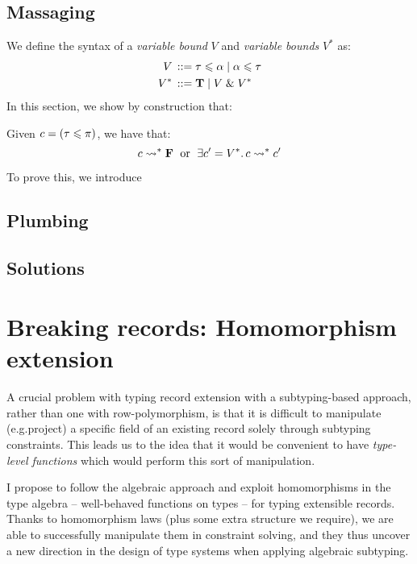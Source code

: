 \subsection{Massaging}
\label{subsec:rewriting}
We define the syntax of a \emph{variable bound} $V$ and \emph{variable bounds} $V^*$ as:
\begin{align*}
    {V} \,::=&\; \tau \leqslant \alpha \mid \alpha \leqslant \tau \\
    {V^*} \,::=&\; \mathbf T \mid V \;\&\; V^*
\end{align*}
In this section, we show by construction that:
\begin{proposition}
    Given $c = (\tau \leqslant \pi)$, we have that:
    $$ c \leadsto^* \mathbf F \;\text{ or }\; \exists c' = V^* \ldotp c \leadsto^* c' $$
\end{proposition}
To prove this, we introduce 

\subsection{Plumbing}
\label{subsec:normalisation}
\todo[color=red]{}

\subsection{Solutions}
\label{subsec:simplification}
\todo[color=red]{}

\section{Breaking records: Homomorphism extension}
\label{sec:morphisms}

A crucial problem with typing record extension with a subtyping-based approach, rather than one with row-polymorphism, is that it is difficult to manipulate (e.g.\@ project) a specific field of an existing record solely through subtyping constraints. 
This leads us to the idea that it would be convenient to have \emph{type-level functions} which would perform this sort of manipulation.

I propose to follow the algebraic approach and exploit homomorphisms in the type algebra -- well-behaved functions on types -- for typing extensible records. Thanks to homomorphism laws (plus some extra structure we require), we are able to successfully manipulate them in constraint solving, and they thus uncover a new direction in the design of type systems when applying algebraic subtyping.


